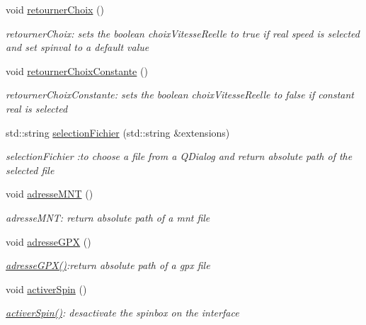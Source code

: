 \begin{DoxyCompactItemize}
\item 
void \hyperlink{classmafenetre_acecb96ebac740d275238059027ebdebd}{retourner\+Choix} ()
\begin{DoxyCompactList}\small\item\em retourner\+Choix\+: sets the boolean choix\+Vitesse\+Reelle to true if real speed is selected and set spinval to a default value \end{DoxyCompactList}\item 
void \hyperlink{classmafenetre_a9934d3087e71db610c1ac37d96194c99}{retourner\+Choix\+Constante} ()
\begin{DoxyCompactList}\small\item\em retourner\+Choix\+Constante\+: sets the boolean choix\+Vitesse\+Reelle to false if constant real is selected \end{DoxyCompactList}\item 
std\+::string \hyperlink{classmafenetre_a8a5ddad65209dae0db28cad9ca448a6b}{selection\+Fichier} (std\+::string \&extensions)
\begin{DoxyCompactList}\small\item\em selection\+Fichier \+:to choose a file from a Q\+Dialog and return absolute path of the selected file \end{DoxyCompactList}\item 
void \hyperlink{classmafenetre_ac7dc61a32b19bc1bba079e3cc3cabd97}{adresse\+M\+N\+T} ()
\begin{DoxyCompactList}\small\item\em adresse\+M\+N\+T\+: return absolute path of a mnt file \end{DoxyCompactList}\item 
void \hyperlink{classmafenetre_a9d0c2380948d6ba6b3c01a826be0f2f1}{adresse\+G\+P\+X} ()
\begin{DoxyCompactList}\small\item\em \hyperlink{classmafenetre_a9d0c2380948d6ba6b3c01a826be0f2f1}{adresse\+G\+P\+X()}\+:return absolute path of a gpx file \end{DoxyCompactList}\item 
void \hyperlink{classmafenetre_a192319ece816878570f7a19bbc147d45}{activer\+Spin} ()
\begin{DoxyCompactList}\small\item\em \hyperlink{classmafenetre_a192319ece816878570f7a19bbc147d45}{activer\+Spin()}\+: desactivate the spinbox on the interface \end{DoxyCompactList}\item 

\end{DoxyCompactItemize}
